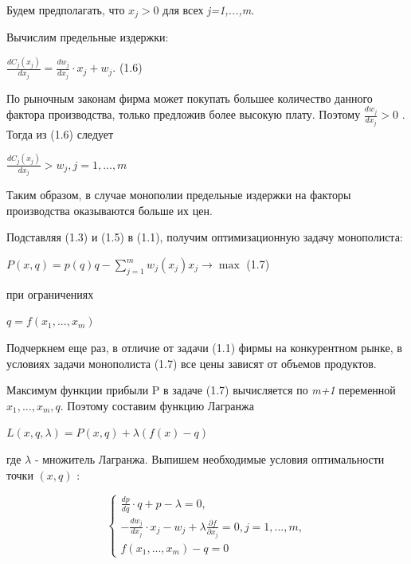 \documentclass[12pt, 4paper]{book}
\begin{document}
{Будем предполагать, что $x_j > 0$ для всех \textit{j=1,...,m}.
\par

Вычислим предельные издержки:
\begin{center}
$\frac{dC_j(x_j)}{d x_j} = \frac{dw_j}{dx_j}\cdot x_j + w_j$. (1.6)
\end{center}
\par

По рыночным законам фирма может покупать большее количество данного фактора производства, только предложив более высокую плату. Поэтому $\frac{dw_j}{d x_j}>0$ . Тогда из (1.6) следует
\begin{center}
$\frac{d C_j(x_j)}{d x_j}> w_j, j=1,...,m$
\end{center}
\par

Таким образом, в случае монополии предельные издержки на факторы производства оказываются больше их цен. 
\par

Подставляя (1.3) и (1.5) в (1.1), получим оптимизационную задачу монополиста:
\begin{center}
$P(x,q)=p(q)q-\sum\limits_{j=1}^{m} w_j (x_j)x_j \rightarrow \max$ (1.7)
\end{center}
\begin{center}
при ограничениях
\end{center}
\begin{center}
$q = f(x_1,...,x_m)$
\end{center}
\par

Подчеркнем еще раз, в отличие от задачи (1.1) фирмы на конкурентном рынке, в условиях задачи монополиста (1.7) все цены зависят от объемов продуктов.
\par

Максимум функции прибыли P в задаче (1.7) вычисляется по \textit{m+1} переменной $x_1,...,x_m,q$. Поэтому составим функцию Лагранжа
\begin{center}
$L(x,q,\lambda)=P(x,q)+\lambda(f(x)-q)$
\end{center}
где $\lambda$ - множитель Лагранжа. Выпишем необходимые условия оптимальности точки $(x,q)$ :
\begin{center}
$$\left\{
\begin{aligned}
\frac{dp}{dq}\cdot q + p - \lambda =0,\\
-\frac{d w_j}{d x_j}\cdot x_j - w_j + \lambda \frac{\partial f}{\partial x_j}=0, j=1,...,m,\\
f(x_1,...,x_m)-q=0  
\end{aligned}
\right.$$
\end{center}
\par

}
\end{document}
